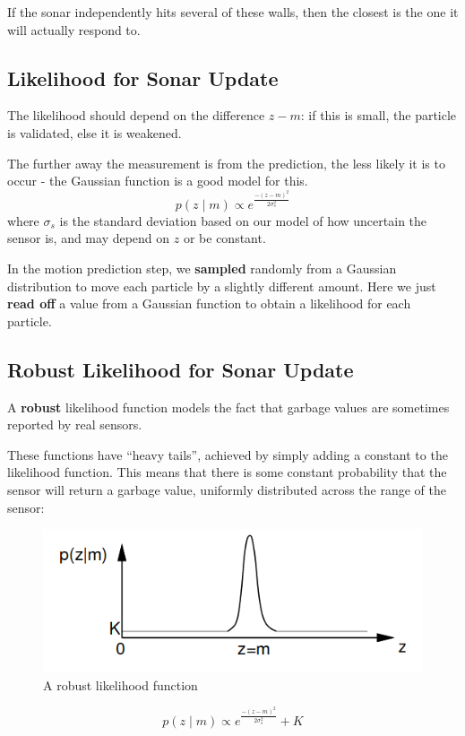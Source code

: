 \documentclass[11pt]{article}
\begin{document}
If the sonar independently hits several of these walls, then the closest is the one it will actually respond to.

\subsection{Likelihood for Sonar Update}
The likelihood should depend on the difference $z - m$: if this is small, the particle is validated, else it is weakened.

The further away the measurement is from the prediction, the less likely it is to occur - the Gaussian function is a good model for this.
\[
  p(z \mid m) \propto e^{\frac{-(z - m)^2}{2 \sigma^2_s}}
\]
where $\sigma_s$ is the standard deviation based on our model of how uncertain the sensor is, and may depend on $z$ or be constant.

In the motion prediction step, we \textbf{sampled} randomly from a Gaussian distribution to move each particle by a slightly different amount.
Here we just \textbf{read off} a value from a Gaussian function to obtain a likelihood for each particle.

\subsection{Robust Likelihood for Sonar Update}
A \textbf{robust} likelihood function models the fact that garbage values are sometimes reported by real sensors.

These functions have ``heavy tails'', achieved by simply adding a constant to the likelihood function.
This means that there is some constant probability that the sensor will return a garbage value, uniformly distributed across the range of the sensor:

\begin{figure}[h]
  \caption{A robust likelihood function}
  \includegraphics[scale=0.4]{robust}
  \centering
\end{figure}

\[
  p(z \mid m) \propto e^{\frac{-(z - m)^2}{2 \sigma^2_s}} + K
\]
\end{document}
